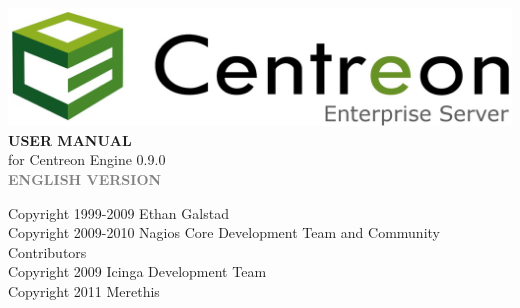 \documentclass[a4paper]{book}
\begin{document}
\begin{titlepage}
\vspace*{1.5cm}
\begin{center}
\mbox{\includegraphics{centreon_logo}}
\vspace*{2cm}
{\fontsize{16}{16} \bf USER MANUAL }\\
{\large for Centreon Engine 0.9.0 }\\
\vspace*{0.5cm}
{\textcolor{gray}{\large \bf ENGLISH VERSION }}\\
\vspace*{6cm}
\end{center}
\end{titlepage}
{\small Copyright 1999-2009 Ethan Galstad\\Copyright 2009-2010 Nagios Core Development Team and Community Contributors\\Copyright 2009 Icinga Development Team\\Copyright 2011 Merethis}\\
\clearemptydoublepage
{}
\tableofcontents
\clearemptydoublepage
{}
\end{document}

